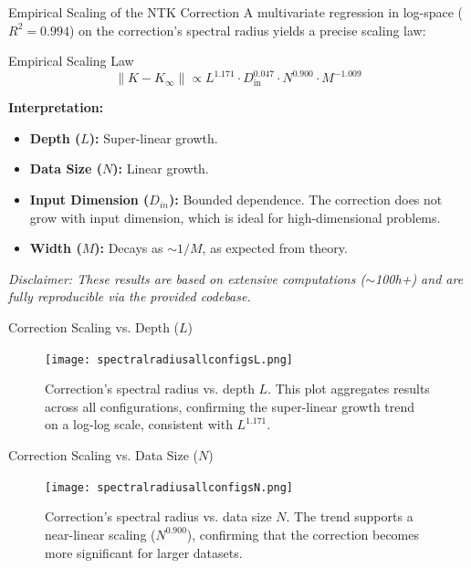 \documentclass{beamer}
\begin{document}
\begin{frame}{Empirical Scaling of the NTK Correction}
A multivariate regression in log-space ($R^2=0.994$) on the correction's spectral radius yields a precise scaling law:

\begin{alertblock}{Empirical Scaling Law}
\[
\|K - K_\infty\| \propto L^{1.171} \cdot D_{\text{in}}^{0.047} \cdot N^{0.900} \cdot M^{-1.009}
\]
\end{alertblock}

\textbf{Interpretation:}
\begin{itemize}
    \item \textbf{Depth ($L$):} Super-linear growth.
    \item \textbf{Data Size ($N$):} Linear growth.
    \item \textbf{Input Dimension ($D_{in}$):} Bounded dependence. The correction does not grow with input dimension, which is ideal for high-dimensional problems.
    \item \textbf{Width ($M$):} Decays as $\sim 1/M$, as expected from theory.
\end{itemize}

\vfill
\tiny{\textit{Disclaimer: These results are based on extensive computations ($\sim$100h+) and are fully reproducible via the provided codebase.}}

\end{frame}

\begin{frame}{Correction Scaling vs. Depth ($L$)}
    \begin{figure}
        \centering
        \texttt{[image: spectralradiusallconfigsL.png]}
        \caption{Correction's spectral radius vs. depth $L$. This plot aggregates results across all configurations, confirming the super-linear growth trend on a log-log scale, consistent with $L^{1.171}$.}
    \end{figure}
\end{frame}

\begin{frame}{Correction Scaling vs. Data Size ($N$)}
    \begin{figure}
        \centering
        \texttt{[image: spectralradiusallconfigsN.png]}
        \caption{Correction's spectral radius vs. data size $N$. The trend supports a near-linear scaling ($N^{0.900}$), confirming that the correction becomes more significant for larger datasets.}
    \end{figure}
\end{frame}
\end{document}
